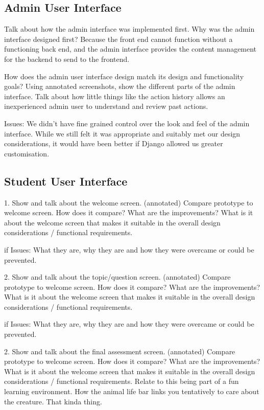 \documentclass{l3proj}
\begin{document}
\subsection{Admin User Interface}
Talk about how the admin interface was implemented first.
Why was the admin interface designed first?
Because the front end cannot function without a functioning back end, and the admin interface provides the content management for the backend to send to the frontend.

How does the admin user interface design match its design and functionality goals?
Using annotated screenshots, show the different parts of the admin interface.
Talk about how little things like the action history allows an inexperienced admin user to understand and review past actions.

Issues: We didn't have fine grained control over the look and feel of the admin interface. While we still felt it was appropriate and suitably met our design considerations, it would have been better if Django allowed us greater customisation.

\subsection{Student User Interface}

1. Show and talk about the welcome screen. (annotated)
Compare prototype to welcome screen. How does it compare? What are the improvements? What is it about the welcome screen that makes it suitable in the overall design considerations / functional requirements.

if Issues: What they are, why they are and how they were overcame or could be prevented.

2. Show and talk about the topic/question screen. (annotated)
Compare prototype to welcome screen. How does it compare? What are the improvements? What is it about the welcome screen that makes it suitable in the overall design considerations / functional requirements.

if Issues: What they are, why they are and how they were overcame or could be prevented.

2. Show and talk about the final assessment screen. (annotated)
Compare prototype to welcome screen. How does it compare? What are the improvements? What is it about the welcome screen that makes it suitable in the overall design considerations / functional requirements. Relate to this being part of a fun learning environment. How the animal life bar links you tentatively to care about the creature. That kinda thing.
\end{document}
